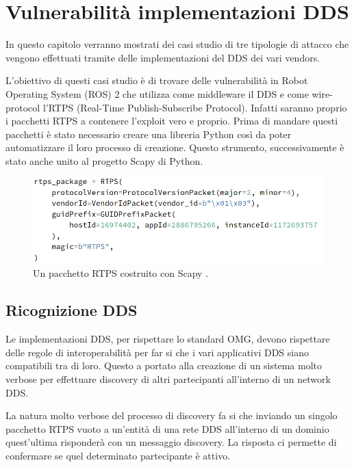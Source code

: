 \chapter{Vulnerabilità implementazioni DDS}

In questo capitolo verranno mostrati dei casi studio
di tre tipologie di 
attacco che vengono effettuati tramite delle 
implementazioni del DDS dei vari vendors.

L'obiettivo di questi casi studio è di trovare delle 
vulnerabilità in Robot Operating System (ROS) 2 che 
utilizza come middleware il DDS e come wire-protocol 
l'RTPS (Real-Time Publish-Subscribe Protocol).
Infatti saranno proprio i pacchetti RTPS a contenere 
l'exploit vero e proprio. Prima di mandare questi 
pacchetti è stato necessario creare una libreria Python 
così da poter automatizzare il loro processo di creazione.
Questo strumento, successivamente è stato anche unito al 
progetto Scapy di Python.

\begin{figure}[H]
    \centering
    \includegraphics[width=15.2cm, keepaspectratio]{img/rptspacketheaderscapy.png}
    \caption{Un pacchetto RTPS costruito 
    con Scapy \cite{mayoral2022robot}.}
    \label{rptspacketheaderscapy}
\end{figure}

\section{Ricognizione DDS}
Le implementazioni DDS, per rispettare lo standard 
OMG, devono rispettare delle regole di interoperabilità 
per far si che i vari applicativi DDS siano compatibili 
tra di loro. Questo a portato alla creazione di un sistema
molto verbose per effettuare discovery 
di altri partecipanti all'interno di un network DDS.


La natura molto verbose del processo di discovery 
fa si che inviando un singolo pacchetto RTPS vuoto 
a un'entità di una rete DDS all'interno di un dominio 
quest'ultima risponderà 
con un messaggio discovery. La risposta ci permette di 
confermare se quel determinato partecipante è attivo.


